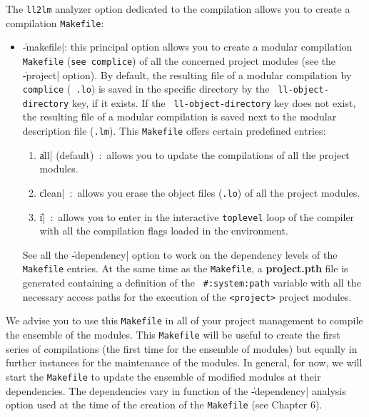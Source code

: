 The {\tt ll2lm} analyzer option dedicated to the compilation allows you to create a compilation {\tt Makefile}:
\begin{itemize}

\item {\Large \|-makefile|}: this principal option allows you to create a modular compilation {\tt Makefile} ({\tt see complice}) of all the concerned project modules (see the \|-project| option). 
By default, the resulting file of a modular compilation by {\tt complice} ({\tt
.lo}) is saved in the specific directory by the {\tt
ll-object-directory} key, if it exists.  If the {\tt
ll-object-directory} key does not exist, the resulting file of a modular compilation is saved next to the modular description file ({\tt .lm}).
This {\tt Makefile} offers certain predefined entries:
\begin {enumerate}
\item \|all| (default)\ :\ 
allows you to update the compilations of all the project modules.
\item \|clean|\ :\ 
allows you erase the object files ({\tt .lo}) of all the project modules.
\BeginLL
\EndLL
\item \|i|\ :\ 
allows you to enter in the interactive {\tt toplevel} loop of the compiler with all the compilation flags loaded in the environment.
\BeginLL
\EndLL
\end{enumerate}
See all the \|-dependency| option to work on the dependency levels of the 
{\tt Makefile} entries.  At the same time as the {\tt Makefile}, a {\bf
project.pth} file is generated containing a definition of the {\tt
\#:system:path} variable with all the necessary access paths for the execution of the {\tt <project>} project modules.

\end{itemize}

We advise you to use this {\tt Makefile} in all of your project management to compile the ensemble of the modules.  This {\tt Makefile} will be useful to create the first series of compilations (the first time for the ensemble of modules) but equally in further instances for the maintenance of the modules.
In general, for now, we will start the {\tt Makefile} to update the ensemble of modified modules at their dependencies.  The dependencies vary in function of the \|-dependency| analysis option used at the time of the creation of the {\tt Makefile} (see Chapter 6).

